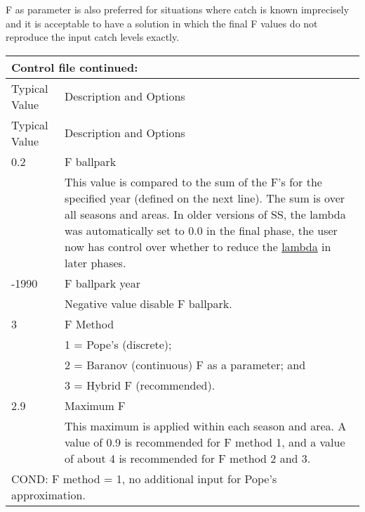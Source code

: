 F as parameter is also preferred for situations where catch is known imprecisely and it is acceptable to have a solution in which the final F values do not reproduce the input catch levels exactly. 

\begin{longtable}{p{1cm} p{3cm} p{11cm}}
	\multicolumn{3}{l}{Control file continued:}\\
	\hline
	\multicolumn{2}{l}{Typical Value} & Description and Options\Tstrut\Bstrut\\
	\hline
	\endfirsthead

	\hline
	\multicolumn{2}{l}{Typical Value} & Description and Options\Tstrut\Bstrut\\
	\hline
	\endhead

	\hline
	\endfoot
	\endlastfoot

	0.2 \Tstrut & & F ballpark\\
	    & & This value is compared to the sum of the F's for the specified year (defined on the next line). The sum is over all seasons and areas. In older versions of SS, the lambda was automatically set to 0.0 in the final phase, the user now has control over whether to reduce the \hyperlink{Lambdas}{lambda} in later phases.\Bstrut\\
   \hline

	-1990\Tstrut & & F ballpark year\\
	      & & Negative value disable F ballpark.\Bstrut\\
   \hline

	3 \Tstrut & & F Method \\
	   & & 1 = Pope's (discrete); \\
	   & & 2 = Baranov (continuous) F as a parameter; and \\
	   & & 3 = Hybrid F (recommended).\Bstrut\\
   \hline

   2.9 \Tstrut & & Maximum F \\
       & & This maximum is applied within each season and area.   A value of 0.9 is recommended for F method 1, and a value of about 4 is recommended for F method 2 and 3. \Bstrut\\
   \hline

   \multicolumn{3}{l}{COND: F method = 1, no additional input for Pope's approximation.}\Tstrut\Bstrut\\
   \hline


\end{longtable}
